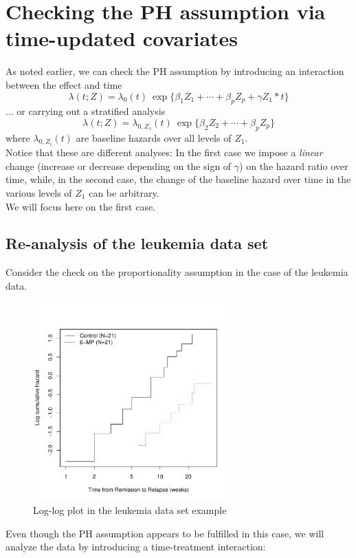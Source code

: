 \documentclass[10pt]{book}
\begin{document}
\section{Checking the PH assumption via time-updated covariates}
As noted earlier, we can check the PH assumption by introducing an interaction between the effect and time
\[   \lambda(t; Z)  = \lambda_0(t) ~ \exp\{\beta_1 Z_1 + \cdots + \beta_p Z_p + \gamma Z_1*t\} \]
... or carrying out a stratified analysis
\[   \lambda(t; Z)  = \lambda_{0,Z_1}(t) ~ \exp\{\beta_2 Z_2 + \cdots + \beta_p Z_p\} \]
where $\lambda_{0,Z_i}(t)$ are baseline hazards over all levels of $Z_1$.\\[2ex]
Notice that these are different analyses: In the first case we impose a \textit{linear} change (increase or decrease depending on the sign of $\gamma$) on the hazard ratio over time, while, in the second case, the change of the baseline hazard over time in the various levels of $Z_1$ can be arbitrary.\\[2ex]
We will focus here on the first case.
\subsection{Re-analysis of the leukemia data set}
Consider the check on the proportionality assumption in the case of the leukemia data.
\begin{figure}[h!]
\caption{Log-log plot in the leukemia data set example}
\centerline{\includegraphics[width=3in]{leukemlogHaz.pdf}}
\end{figure}
\newpage\noindent
Even though the PH assumption appears to be fulfilled in this case, we will analyze the data by introducing a time-treatment interaction:
\end{document}
